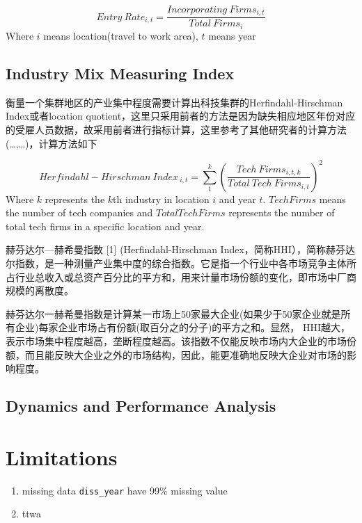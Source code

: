 \documentclass[
  12pt,
  oneside]{book}
\begin{document}
\[ Entry\ Rate_{i,t} = \frac{Incorporating\ Firms_{i,t}}{Total\  Firms_{i}} \]
Where \(i\) means location(travel to work area), \(t\) means year

\hypertarget{industry-mix-measuring-index}{%
\subsection{Industry Mix Measuring Index}\label{industry-mix-measuring-index}}

衡量一个集群地区的产业集中程度需要计算出科技集群的Herfindahl-Hirschman Index或者location quotient，这里只采用前者的方法是因为缺失相应地区年份对应的受雇人员数据，故采用前者进行指标计算，这里参考了其他研究者的计算方法(\ldots,\ldots)，计算方法如下

\[ Herfindahl-Hirschman \ Index_{\ i,t} = \sum_1^k (\frac{Tech\ Firms_{i,t,k}}{Total\ Tech\ Firms_{i,t}})^2 \]
Where \(k\) represents the \(k\)th industry in location \(i\) and year \(t\). \(Tech Firms\) means the number of tech companies and \(Total Tech Firms\) represents the number of total tech firms in a specific location and year.

赫芬达尔---赫希曼指数 {[}1{]} (Herfindahl-Hirschman Index，简称HHI），简称赫芬达尔指数，是一种测量产业集中度的综合指数。它是指一个行业中各市场竞争主体所占行业总收入或总资产百分比的平方和，用来计量市场份额的变化，即市场中厂商规模的离散度。

赫芬达尔一赫希曼指数是计算某一市场上50家最大企业(如果少于50家企业就是所有企业)每家企业市场占有份额(取百分之的分子)的平方之和。显然， HHI越大，表示市场集中程度越高，垄断程度越高。该指数不仅能反映市场内大企业的市场份额，而且能反映大企业之外的市场结构，因此，能更准确地反映大企业对市场的影响程度。

\hypertarget{dynamics-and-performance-analysis}{%
\subsection{Dynamics and Performance Analysis}\label{dynamics-and-performance-analysis}}

\hypertarget{limitations}{%
\section{Limitations}\label{limitations}}

\begin{enumerate}
\def\labelenumi{\arabic{enumi}.}
\item
  missing data
  \texttt{diss\_year} have 99\% missing value
\item
  ttwa
\end{enumerate}
\end{document}
